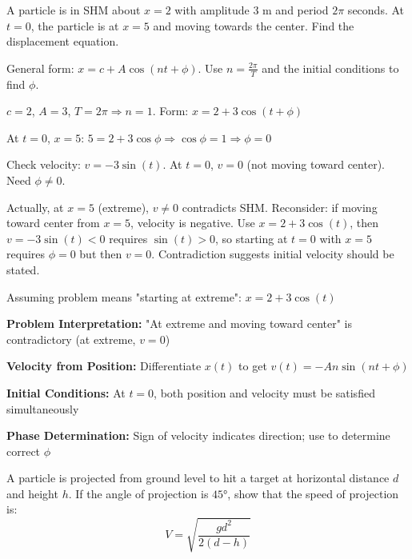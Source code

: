 \begin{problem}
A particle is in SHM about $x = 2$ with amplitude 3 m and period $2\pi$ seconds. At $t = 0$, the particle is at $x = 5$ and moving towards the center. Find the displacement equation.
\end{problem}

\begin{hint}
General form: $x = c + A\cos(nt + \phi)$. Use $n = \frac{2\pi}{T}$ and the initial conditions to find $\phi$.
\end{hint}

\begin{solution}
$c = 2$, $A = 3$, $T = 2\pi \Rightarrow n = 1$. Form: $x = 2 + 3\cos(t + \phi)$

At $t=0$, $x=5$: $5 = 2 + 3\cos\phi \Rightarrow \cos\phi = 1 \Rightarrow \phi = 0$

Check velocity: $v = -3\sin(t)$. At $t=0$, $v = 0$ (not moving toward center). Need $\phi \neq 0$.

Actually, at $x=5$ (extreme), $v \neq 0$ contradicts SHM. Reconsider: if moving toward center from $x=5$, velocity is negative. Use $x = 2 + 3\cos(t)$, then $v = -3\sin(t) < 0$ requires $\sin(t) > 0$, so starting at $t=0$ with $x=5$ requires $\phi = 0$ but then $v=0$. Contradiction suggests initial velocity should be stated.

Assuming problem means "starting at extreme": $x = 2 + 3\cos(t)$
\end{solution}

\begin{takeaways}
\item \textbf{Problem Interpretation:} "At extreme and moving toward center" is contradictory (at extreme, $v=0$)
\item \textbf{Velocity from Position:} Differentiate $x(t)$ to get $v(t) = -A n\sin(nt + \phi)$
\item \textbf{Initial Conditions:} At $t=0$, both position and velocity must be satisfied simultaneously
\item \textbf{Phase Determination:} Sign of velocity indicates direction; use to determine correct $\phi$
\end{takeaways}

\begin{problem}
A particle is projected from ground level to hit a target at horizontal distance $d$ and height $h$. If the angle of projection is $45°$, show that the speed of projection is:
$$V = \sqrt{\frac{gd^2}{2(d-h)}}$$
\end{problem}

